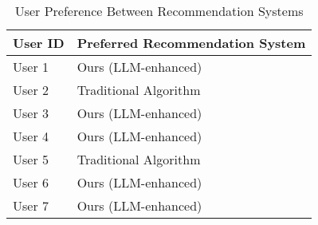 \documentclass[sigconf]{acmart}
\begin{document}
\begin{table} \centering \caption{User Preference Between Recommendation Systems} \label{tab:user_preferences} \begin{tabular}{l l} \toprule \textbf{User ID} & \textbf{Preferred Recommendation System} \\ 
\midrule User 1 & Ours (LLM-enhanced) \\ User 2 & Traditional Algorithm \\ User 3 & Ours (LLM-enhanced) \\ User 4 & Ours (LLM-enhanced) \\ User 5 & Traditional Algorithm \\ User 6 & Ours (LLM-enhanced) \\ User 7 & Ours (LLM-enhanced) \\ \bottomrule \end{tabular} \end{table}
 
\end{document}
